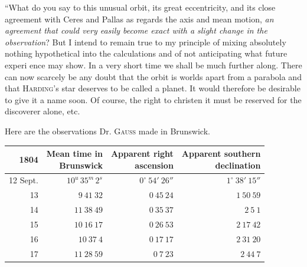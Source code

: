 “What do you say to this unusual orbit, its great eccentricity, and its close agreement with Ceres and Pallas as regards the axis and mean motion, \textit{an agreement that could very easily become exact with a slight change in the observation}? But I intend to remain true to my principle of mixing absolutely nothing hypothetical into the calculations and of not anticipating what future experi%
%
ence may show. In a very short time we shall be much further along. There can now scarcely be any doubt that the orbit is worlds apart from a parabola and that \textsc{Harding}’s star deserves to be called a planet. It would therefore be desirable to give it a name soon. Of course, the right to christen it must be reserved for the discoverer alone, etc.

Here are the observations Dr. \textsc{Gauss} made in Brunswick.

\begin{center}
\begingroup\fontsize{9}{11}\selectfont\setlength{\tabcolsep}{3pt}\renewcommand{\arraystretch}{1.12}
\begin{tabular}{r|r|r|r}
1804 & \shortstack{Mean time in\\Brunswick} & \shortstack{Apparent right\\ascension} & \shortstack{Apparent southern\\declination} \\ \hline
12 Sept. & $10^{u}\,35^{m}\,2^{s}$ & $0^\circ\ 54'\ 26''$ & $1^\circ\ 38'\ 15''$ \\
13 & $9\ 41\ 32$ & $0\ 45\ 24$ & $1\ 50\ 59$ \\
14 & $11\ 38\ 49$ & $0\ 35\ 37$ & $2\ 5\ 1$ \\
15 & $10\ 16\ 17$ & $0\ 26\ 53$ & $2\ 17\ 42$ \\
16 & $10\ 37\ 4$ & $0\ 17\ 17$ & $2\ 31\ 20$ \\
17 & $11\ 28\ 59$ & $0\ 7\ 23$ & $2\ 44\ 7$ \\
\end{tabular}\endgroup
\end{center}

